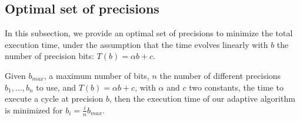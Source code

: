 \subsection{Optimal set of precisions}

In this subsection, we provide an optimal set of precisions to minimize the
total execution time, under the assumption that the time evolves linearly with
$b$ the number of precision bits: $T(b) = \alpha b + c$. 

   \begin{theorem}

       Given $b_{max}$, a maximum number of bits, $n$ the number of different
       precisions $b_1,\dots,b_n$ to use, and $T(b)=\alpha b+c$, with $\alpha$
       and $c$ two constants, the time to execute a cycle at precision $b$,
       then the execution time of our adaptive algorithm is minimized for $b_i
       = \frac{i}{n}b_{max}$.

   \end{theorem}

